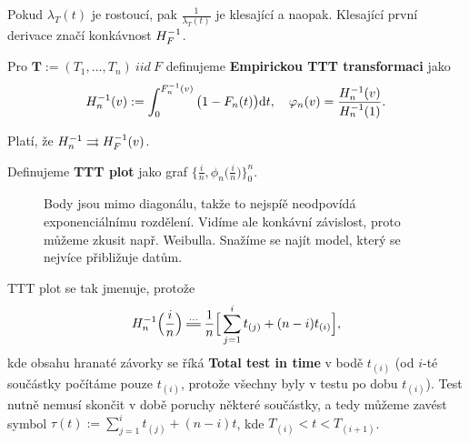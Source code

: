     Pokud $\lambda_T(t)$ je rostoucí, pak $\frac{1}{\lambda_T(t)}$ je klesající a naopak. Klesající první derivace značí konkávnost $H_F^{-1}$.

    \begin{define}
        Pro $\textbf{T}:=(T_1,...,T_n)~iid~F$ definujeme \textbf{Empirickou TTT transformaci} jako
        $$ H_n^{-1}(v):=\int_{0}^{F_n^{-1}(v)}\big(1-F_n(t)\big)\mathrm{d} t,\quad \varphi_n(v)=\frac{H_n^{-1}(v)}{H_n^{-1}(1)}. $$
    \end{define}

    \begin{theorem}
        Platí, že $H_n^{-1}\rightrightarrows H_F^{-1}(v)$.
    \end{theorem}

    \begin{define}
        Definujeme \textbf{TTT plot} jako graf $\Big\{\frac{i}{n},\phi_n\big(\frac{i}{n}\big)\Big\}_0^n$.
    \end{define}

    \begin{figure}[h]
        \centering    
        \caption{Body jsou mimo diagonálu, takže to nejspíě neodpovídá exponenciálnímu rozdělení. Vidíme ale konkávní závislost, proto můžeme zkusit např. Weibulla. Snažíme se najít model, který se nejvíce přibližuje datům.} 
        \label{ttt-plot}
    \end{figure}

    \begin{remark}
        TTT plot se tak jmenuje, protože $$\inv{H_n}\Big(\frac{i}{n}\Big)\equal{...}\frac{1}{n}\Big[\sum_{j=1}^i t_{(j)}+(n-i)t_{(i)}\Big],$$ kde obsahu hranaté závorky se říká \textbf{Total test in time} v bodě $t_{(i)}$ (od $i$-té součástky počítáme pouze $t_{(i)}$, protože všechny byly v testu po dobu $t_{(i)}$). Test nutně nemusí skončit v době poruchy některé součástky, a tedy můžeme zavést symbol $\tau(t):=\sum_{j=1}^it_{(j)}+(n-i)t$, kde $T_{(i)}<t<T_{(i+1)}$.
    \end{remark}

